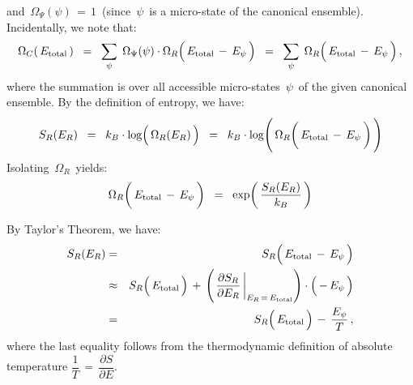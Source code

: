 and
\,$\Omega_{\Psi}(\psi) \,=\, 1$\,
(since \,$\psi$\, is a micro-state of the canonical ensemble).
\vskip 0.4cm
\noindent
Incidentally, we note that:
\begin{equation*}
\Omega_{C}\!\left(\,E_{\textnormal{total}}\,\right)
\;\; = \;\;
    \underset{\psi}{\sum}\;\,
    \Omega_{\Psi}(\psi)
    \cdot
    \Omega_{R}\!\left(\,E_{\textnormal{total}} \,\overset{{\color{white}.}}{-}\, E_{\psi}\,\right)
\;\; = \;\;
    \underset{\psi}{\sum}\;\,
    \Omega_{R}\!\left(\,E_{\textnormal{total}} \,\overset{{\color{white}.}}{-}\, E_{\psi}\,\right),
\end{equation*}
where the summation is over all accessible micro-states \,$\psi$\,
of the given canonical ensemble.
\vskip 0.4cm
\noindent
By the {\color{red}definition of entropy}, we have:
\begin{equation*}
S_{R}(E_{R})
\;\; = \;\;
    k_{B}
    \cdot
    \log\!\left(\,\overset{{\color{white}.}}{
        \Omega_{R}(E_{R})
        }\,\right)
\;\; = \;\;
    k_{B}
    \cdot
    \log\!\left(\,\overset{{\color{white}.}}{
        \Omega_{R}\!\left(\,E_{\textnormal{total}} \,\overset{{\color{white}1}}{-}\, E_{\psi}\,\right)
        }\,\right)
\end{equation*}
Isolating \,$\Omega_{R}$\, yields:
\begin{equation*}
\Omega_{R}\!\left(\,E_{\textnormal{total}} \,\overset{{\color{white}1}}{-}\, E_{\psi}\,\right)
\;\; = \;\;
    \exp\!\left(\,
        \dfrac{ S_{R}(E_{R}) }{ k_{B} }
        \,\right)
\end{equation*}

\noindent
By Taylor's Theorem, we have:
\begin{eqnarray*}
S_{R}(E_{R})
& = &
    S_{R}\!\left(\,\overset{{\color{white}.}}{
        E_{\textnormal{total}} \,-\, E_{\psi}
        }\,\right)
\\
& \approx &
    S_{R}\!\left(\,\overset{{\color{white}.}}{
        E_{\textnormal{total}}
        }\,\right)
    \, + \,
    \left(
        \left.
        \dfrac{\partial S_{R}}{\partial E_{R}}
        \,\right\vert_{E_{R} \,=\, E_{\textnormal{total}}}
        \right)
    \cdot
    \left(\,\overset{{\color{white}.}}{-\,E_{\psi}}\,\right)
\\
& = &
    S_{R}\!\left(\,\overset{{\color{white}.}}{
        E_{\textnormal{total}}
        }\,\right)
    \, - \,
    \dfrac{E_{\psi}}{T}\,,
\end{eqnarray*}
where the last equality follows from
the {\color{red}thermodynamic definition of absolute temperature}
\;$
\dfrac{1}{T}
\, = \,
    \dfrac{
        \partial S
        }{
        \partial E
        }
$.\;

